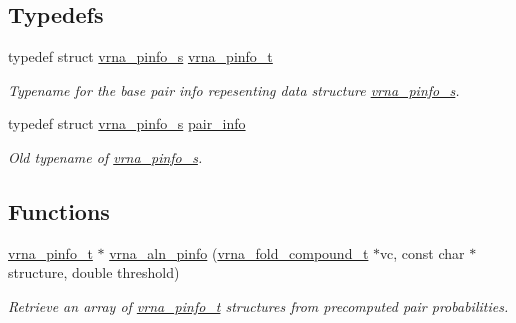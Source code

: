 \subsection*{Typedefs}
\begin{DoxyCompactItemize}
\item 
\hypertarget{group__aln__utils_ga6660dfca23debee7306e0cd53341263f}{typedef struct \hyperlink{group__aln__utils_structvrna__pinfo__s}{vrna\-\_\-pinfo\-\_\-s} \hyperlink{group__aln__utils_ga6660dfca23debee7306e0cd53341263f}{vrna\-\_\-pinfo\-\_\-t}}\label{group__aln__utils_ga6660dfca23debee7306e0cd53341263f}

\begin{DoxyCompactList}\small\item\em Typename for the base pair info repesenting data structure \hyperlink{group__aln__utils_structvrna__pinfo__s}{vrna\-\_\-pinfo\-\_\-s}. \end{DoxyCompactList}\item 
typedef struct \hyperlink{group__aln__utils_structvrna__pinfo__s}{vrna\-\_\-pinfo\-\_\-s} \hyperlink{group__aln__utils_ga7b61662a793ad0aa1ea38efc3a5baacc}{pair\-\_\-info}
\begin{DoxyCompactList}\small\item\em Old typename of \hyperlink{group__aln__utils_structvrna__pinfo__s}{vrna\-\_\-pinfo\-\_\-s}. \end{DoxyCompactList}\end{DoxyCompactItemize}
\subsection*{Functions}
\begin{DoxyCompactItemize}
\item 
\hyperlink{group__aln__utils_ga6660dfca23debee7306e0cd53341263f}{vrna\-\_\-pinfo\-\_\-t} $\ast$ \hyperlink{group__aln__utils_gaf6421a1318586c59fea6a127ed9f65f3}{vrna\-\_\-aln\-\_\-pinfo} (\hyperlink{group__fold__compound_ga1b0cef17fd40466cef5968eaeeff6166}{vrna\-\_\-fold\-\_\-compound\-\_\-t} $\ast$vc, const char $\ast$structure, double threshold)
\begin{DoxyCompactList}\small\item\em Retrieve an array of \hyperlink{group__aln__utils_ga6660dfca23debee7306e0cd53341263f}{vrna\-\_\-pinfo\-\_\-t} structures from precomputed pair probabilities. \end{DoxyCompactList}\end{DoxyCompactItemize}


